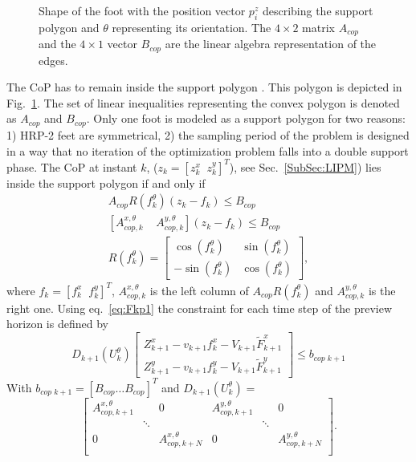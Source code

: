 \begin{figure}[ht]
    \centering
    \scalebox{.8}{}
    \caption[Balance constraint]{Shape of the foot with the position vector $ {p}^z_{i} $ describing the support polygon and $ \theta $ representing its orientation.
    The $4\times2$ matrix $A_{cop}$ and the $4\times1$ vector $B_{cop}$ are the linear algebra representation of the edges.}
	\label{fig:foot}
\end{figure}

The CoP has to remain inside the support polygon \cite{Wieber:IWFFFR:2002}.
This polygon is depicted in Fig.~\ref{fig:foot}.
The set of linear inequalities representing the convex polygon is denoted as $A_{cop}$ and $B_{cop}$.
Only one foot is modeled as a support polygon for two reasons:
1) HRP-2 feet are symmetrical, 2) the sampling period of the problem is designed in a way that no iteration of the optimization problem falls into a double support phase.
The CoP at instant $k$, \mbox{($z_k = [z_k^x \;\; z_k^y]^T$)}, see Sec.~\ref{SubSec:LIPM}) lies inside the support polygon if and only if
\begin{align}
  A_{cop} R(f_k^\theta) \left( {z}_k - f_k
  \right) \leq B_{cop} \\
  \left[A_{cop,k}^{x,\theta} \;\;\;\;  A_{cop,k}^{y,\theta} \right] \left( {z}_k - f_k
  \right) \leq B_{cop} \\
  R(f_k^{\theta} ) =
  \begin{bmatrix}
  \cos(f_k^\theta) & \sin(f_k^\theta)\\
  -\sin(f_k^\theta) & \cos(f_k^\theta)
  \end{bmatrix}
  ,
\end{align}
where $f_k = [f_k^x \;\; f_k^y]^T$, $A_{cop,k}^{x,\theta}$ is the left column of $A_{cop} R(f_k^\theta)$ and $A_{cop,k}^{y,\theta}$ is the right one.
Using eq.~\eqref{eq:Fkp1} the constraint for each time step of the preview horizon is defined by
\begin{equation}
\label{eq:cop_constraint_extended}
D_{k+1}(U_k^\theta)
\begin{bmatrix}
Z_{k+1}^x - v_{k+1} f_{k}^x - V_{k+1} \tilde{F}_{k+1}^x \\
Z_{k+1}^y - v_{k+1} f_{k}^y - V_{k+1} \tilde{F}_{k+1}^y
\end{bmatrix} \leq
b_{cop}\,_{k+1}
\end{equation}
With $b_{cop}\,_{k+1} = [B_{cop} \hdots B_{cop}]^T$ and $D_{k+1}(U_k^\theta) = $
\begin{equation*}
\begin{bmatrix}
A_{cop,k+1}^{x,\theta} & & 0 & A_{cop,k+1}^{y,\theta} & & 0 \\
 & \ddots & & & \ddots \\
0 & & A_{cop,k+N}^{x,\theta} & 0 & & A_{cop,k+N}^{y,\theta} \\
\end{bmatrix}
.
\end{equation*}
